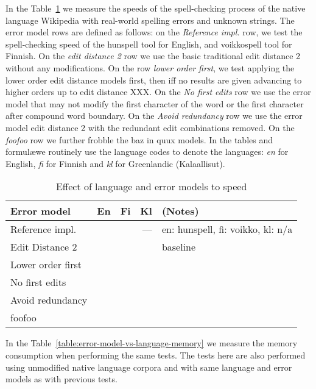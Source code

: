 \documentclass[11pt]{article}
\begin{document}
In the Table~\ref{table:error-model-vs-language-speed} we measure the speeds of
the spell-checking process of the native language Wikipedia with real-world
spelling errors and unknown strings. The error model rows are defined as
follows: on the \emph{Reference impl.} row, we test the spell-checking speed of
the hunspell tool for English, and voikkospell tool for Finnish. On the
\emph{edit distance 2} row we use the basic traditional edit distance 2 without
any modifications. On the row \emph{lower order first}, we test applying the
lower order edit distance models first, then iff no results are given advancing
to higher orders up to edit distance XXX. On the \emph{No first edits} row we
use the error model that may not modify the first character of the word or the
first character after compound word boundary. On the \emph{Avoid redundancy}
row we use the error model edit distance 2 with the redundant edit combinations
removed. On the \emph{foofoo} row we further frobble the baz  in quux models.
In the tables and formul\ae we routinely use the language codes to denote the
languages: \emph{en} for English, \emph{fi} for Finnish and \emph{kl} for 
Greenlandic (Kalaallisut). 

\begin{table}[h]
\begin{center}
\begin{scriptsize}
\begin{tabular}{|l|rrrl|}
\hline
\bf Error model & \bf En & \bf Fi & \bf Kl & (Notes) \\ 
\hline
Reference impl.   & & & --- & en: hunspell, fi: voikko, kl: n/a \\
\hline
Edit Distance 2   & & & & baseline \\
Lower order first & & & & \\
No first edits    & & & & \\
Avoid redundancy  & & & & \\
foofoo            & & & & \\
\hline
\end{tabular}
\end{scriptsize}
\end{center}
\caption{\label{table:error-model-vs-language-speed} Effect of language and 
error models to speed}
\end{table}

In the Table~\ref{table:error-model-vs-language-memory} we measure the memory
consumption when performing the same tests. The tests here are also performed
using unmodified native language corpora and with same language and error
models as with previous tests.
\end{document}
